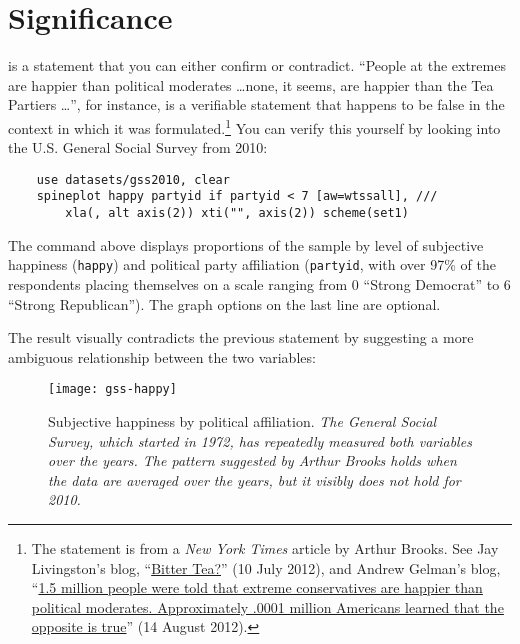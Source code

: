 \chapter{Significance}%
	\label{ch:sig}%


	 is a statement that you can either confirm or contradict. ``People at the extremes are happier than political moderates \dots none, it seems, are happier than the Tea Partiers \dots'', for instance, is a verifiable statement that happens to be false in the context in which it was formulated.\footnote{The statement is from a \emph{New York Times} article by Arthur Brooks. See Jay Livingston's blog, ``\href{http://montclairsoci.blogspot.ch/2012/07/bitter-tea.html}{Bitter Tea?}'' (10 July 2012), and Andrew Gelman's blog, ``\href{http://andrewgelman.com/2012/08/1-5-million-people-were-told-that-extreme-conservatives-are-happier-than-political-moderates-approximately-0001-million-americans-learned-that-the-opposite-is-true/}{1.5 million people were told that extreme conservatives are happier than political moderates. Approximately .0001 million Americans learned that the opposite is true}'' (14 August 2012).} You can verify this yourself by looking into the U.S. General Social Survey from 2010:%

	\begin{verbatim}
	use datasets/gss2010, clear
	spineplot happy partyid if partyid < 7 [aw=wtssall], ///
	    xla(, alt axis(2)) xti("", axis(2)) scheme(set1)
	\end{verbatim}

The  command above displays proportions of the sample by level of subjective happiness (\texttt{happy}) and political party affiliation (\texttt{partyid}, with over 97\% of the respondents placing themselves on a scale ranging from 0 ``Strong Democrat'' to 6 ``Strong Republican''). The graph options on the last line are optional.

The result visually contradicts the previous statement by suggesting a more ambiguous relationship between the two variables:

\begin{figure}
    \texttt{[image: gss-happy]}
    \caption[Subjective happiness by political affiliation.]%
    {Subjective happiness by political affiliation. %
    \emph{The General Social Survey, which started in 1972, has repeatedly measured both variables over the years. The pattern suggested by Arthur Brooks holds when the data are averaged over the years, but it visibly does not hold for 2010.}}%
    \label{fig:stata-window}
\end{figure}

